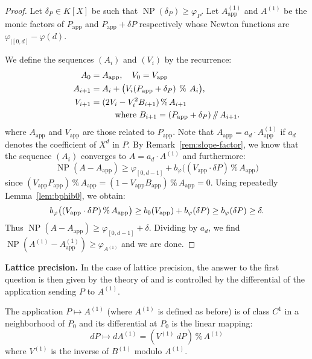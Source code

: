 \documentclass{sig-alternate-2013}
\DeclareMathOperator{\NP}{NP}
\renewcommand{\mod}{\,\%\,}
\renewcommand{\div}{\,/\hspace{-0.3em}/\,}
\newcommand{\app}{\textrm{app}}
\begin{document}
\begin{proof}
Let $\delta_P \in K[X]$ be such that $\NP(\delta_P) \geq \varphi_P$.
Let $A_\app^{(1)}$ and $A^{(1)}$ be the monic factors of $P_\app$
and $P_\app + \delta P$ respectively whose Newton functions are
$\varphi_{|[0,d]} - \varphi(d)$.

We define the sequences $(A_i)$ and $(V_i)$ by the recurrence: 
\begin{align*} 
A_0 & = A_\app, \quad V_{0} = V_\app \medskip \\ A_{i+1} 
&= A_i + \big(V_i (P_\app + \delta_P) \:\mod\: A_i\big), \smallskip \\ 
V_{i+1} &= (2 V_i -V_i^2 B_{i+1} ) \mod A_{i+1} \\ 
&  \hspace{1cm}\text{where } B_{i+1} = (P_\app + \delta_P) \div A_{i+1}. 
\end{align*} 
where $A_\app$ and $V_\app$ are those related to $P_\app$. Note that 
$A_\app = a_d \cdot A^{(1)}_\app$ if $a_d$ denotes the coefficient of 
$X^d$ in $P$. By Remark~\ref{rem:slope-factor}, we know that the 
sequence $(A_i)$ converges to $A = a_d \cdot A^{(1)}$ and furthermore:
$$\NP(A - A_\app) \geq \varphi_{[0,d{-}1]} + 
b_\varphi\big((V_\app \cdot \delta P) \mod A_\app\big)$$ 
since $(V_\app P_\app) \mod A_\app = (1 - V_\app B_\app) \mod A_\app = 
0$. Using repeatedly Lemma~\ref{lem:bphib0}, we obtain:
$$b_\varphi\big((V_\app \cdot \delta P) \mod A_\app\big)
  \geq b_0(V_\app) + b_\varphi(\delta P) \\
  \geq b_\varphi(\delta P) \geq \delta.$$
Thus $\NP(A - A_\app) \geq \varphi_{[0,d{-}1]} + \delta$. Dividing
by $a_d$, we find
$\NP(A^{(1)} - A^{(1)}_\app) \geq \varphi_{A^{(1)}}$ and we are done.
\end{proof}

\medskip

\noindent
{\bf Lattice precision.}
In the case of lattice precision, the answer to the first question is 
then given by the theory of \cite{padicprec} and is controlled by the 
differential of the application sending $P$ to $A^{(1)}$.

\begin{prop}
\label{prop:precA1}
The application $P \mapsto A^{(1)}$ (where $A^{(1)}$ is defined as before) is 
of class $C^1$ in a neighborhood of $P_0$ and its differential 
at $P_0$ is the linear mapping:
$$dP \mapsto dA^{(1)} = (V^{(1)} \: dP) \mod A^{(1)}$$
where $V^{(1)}$ is the inverse of $B^{(1)}$ modulo $A^{(1)}$.
\end{prop}
\end{document}

